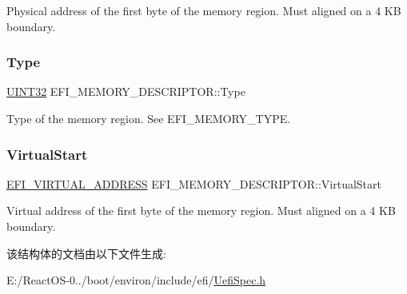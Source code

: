Physical address of the first byte of the memory region. Must aligned on a 4 KB boundary. \mbox{\label{struct_e_f_i___m_e_m_o_r_y___d_e_s_c_r_i_p_t_o_r_ad524e0cfcc4cfe94d02a86e91ae6c225}} 
\subsubsection{\texorpdfstring{Type}{Type}}
{\footnotesize\ttfamily \hyperlink{_processor_bind_8h_ae1e6edbbc26d6fbc71a90190d0266018}{U\+I\+N\+T32} E\+F\+I\+\_\+\+M\+E\+M\+O\+R\+Y\+\_\+\+D\+E\+S\+C\+R\+I\+P\+T\+O\+R\+::\+Type}

Type of the memory region. See E\+F\+I\+\_\+\+M\+E\+M\+O\+R\+Y\+\_\+\+T\+Y\+PE. \mbox{\label{struct_e_f_i___m_e_m_o_r_y___d_e_s_c_r_i_p_t_o_r_a406b40627f95a63a17a20ec1e1f72e7c}} 
\subsubsection{\texorpdfstring{Virtual\+Start}{VirtualStart}}
{\footnotesize\ttfamily \hyperlink{_uefi_base_type_8h_a353ea2e3d6220a4e32c5f1eb39a1ed6a}{E\+F\+I\+\_\+\+V\+I\+R\+T\+U\+A\+L\+\_\+\+A\+D\+D\+R\+E\+SS} E\+F\+I\+\_\+\+M\+E\+M\+O\+R\+Y\+\_\+\+D\+E\+S\+C\+R\+I\+P\+T\+O\+R\+::\+Virtual\+Start}

Virtual address of the first byte of the memory region. Must aligned on a 4 KB boundary. 

该结构体的文档由以下文件生成\+:\begin{DoxyCompactItemize}
\item 
E\+:/\+React\+O\+S-\/0../boot/environ/include/efi/\hyperlink{_uefi_spec_8h}{Uefi\+Spec.\+h}\end{DoxyCompactItemize}
